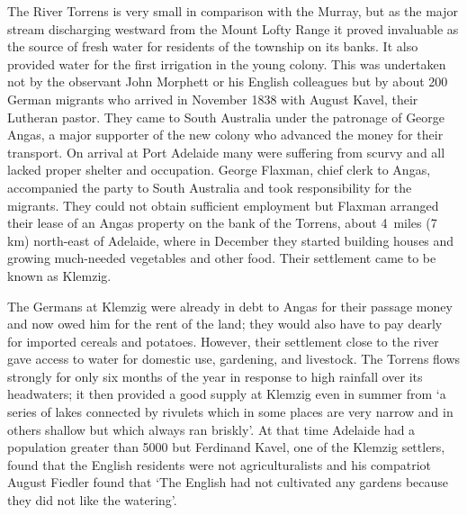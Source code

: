 The River Torrens is very small in comparison with the Murray, but as
the major stream discharging westward from the Mount Lofty Range it
proved invaluable as the source of fresh water for residents of the
township on its banks.  It also provided water for the first
irrigation in the young colony.  This was undertaken not by the
observant John Morphett or his English colleagues but by about 200
German migrants who arrived in November 1838 with August Kavel, their
Lutheran pastor.  They came to South Australia under the patronage of
George Angas, a major supporter of the new colony who advanced the
money for their transport. On arrival at Port Adelaide many were
suffering from scurvy and all lacked proper shelter and
occupation. George Flaxman, chief clerk to Angas, accompanied the
party to South Australia and took responsibility for the migrants.
They could not obtain sufficient employment but Flaxman arranged their
lease of an Angas property on the bank of the Torrens, about 4~miles
(7\,km) north-east of Adelaide, where in December they started
building houses and growing much-needed vegetables and other food.
Their settlement came to be known as Klemzig.

The Germans at Klemzig were already in debt to Angas for their passage
money and now owed him for the rent of the land; they would also have
to pay dearly for imported cereals and potatoes.  However, their
settlement close to the river gave access to water for domestic use,
gardening, and livestock.  The Torrens flows strongly for only six
months of the year in response to high rainfall over its headwaters;
it then provided a good supply at Klemzig even in summer from `a
series of lakes connected by rivulets which in some places are very
narrow and in others shallow but which always ran
briskly'.  At that
time Adelaide had a population greater than 5000 but Ferdinand
Kavel, one of the Klemzig settlers, found that the English residents
were not agriculturalists and his compatriot August Fiedler found that
`The English had not cultivated any gardens because they did not like
the watering'.

